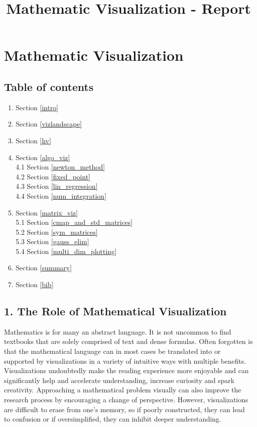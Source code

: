 \documentclass[11pt]{article}
\title{Mathematic Visualization - Report}
\providecommand{\tightlist}{%
      \setlength{\itemsep}{0pt}\setlength{\parskip}{0pt}}
\begin{document}
    
    
    \maketitle
    
    

    
    \section{Mathematic Visualization}\label{mathematic-visualization}

\subsection{Table of contents}\label{table-of-contents}

\begin{enumerate}
\def\labelenumi{\arabic{enumi}.}
\tightlist
\item
  Section \ref{intro}
\item
  Section \ref{vizlandscape}
\item
  Section \ref{hv}
\item
  Section \ref{algo_viz}\\
  4.1 Section \ref{newton_method}\\
  4.2 Section \ref{fixed_point}\\
  4.3 Section \ref{lin_regression}\\
  4.4 Section \ref{num_integration}\\
\item
  Section \ref{matrix_viz}\\
  5.1 Section \ref{cmap_and_std_matrices}\\
  5.2 Section \ref{sym_matrices}\\
  5.3 Section \ref{gauss_elim}\\
  5.4 Section \ref{multi_dim_plotting}\\
\item
  Section \ref{summary}
\item
  Section \ref{bib}
\end{enumerate}

    \subsection{1. The Role of Mathematical Visualization
}\label{the-role-of-mathematical-visualization}

Mathematics is for many an abstract language. It is not uncommon to find
textbooks that are solely comprised of text and dense formulas. Often
forgotten is that the mathematical language can in most cases be
translated into or supported by visualizations in a variety of intuitive
ways with multiple benefits. Visualizations undoubtedly make the reading
experience more enjoyable and can significantly help and accelerate
understanding, increase curiosity and spark creativity. Approaching a
mathematical problem visually can also improve the research process by
encouraging a change of perspective. However, visualizations are
difficult to erase from one's memory, so if poorly constructed, they can
lead to confusion or if oversimplified, they can inhibit deeper
understanding.
\end{document}
